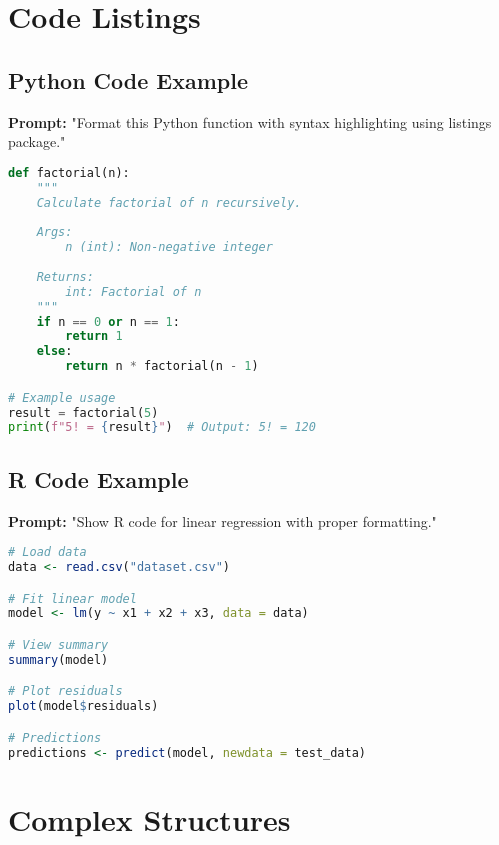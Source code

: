 \documentclass[12pt, a4paper]{article}
\begin{document}
\section{Code Listings}

\subsection{Python Code Example}

\textbf{Prompt:} "Format this Python function with syntax highlighting using listings package."

\begin{lstlisting}[language=Python, caption={Python function for calculating factorial}, label=lst:factorial]
def factorial(n):
    """
    Calculate factorial of n recursively.
    
    Args:
        n (int): Non-negative integer
    
    Returns:
        int: Factorial of n
    """
    if n == 0 or n == 1:
        return 1
    else:
        return n * factorial(n - 1)

# Example usage
result = factorial(5)
print(f"5! = {result}")  # Output: 5! = 120
\end{lstlisting}

\subsection{R Code Example}

\textbf{Prompt:} "Show R code for linear regression with proper formatting."

\begin{lstlisting}[language=R, caption={Linear regression in R}, label=lst:regression]
# Load data
data <- read.csv("dataset.csv")

# Fit linear model
model <- lm(y ~ x1 + x2 + x3, data = data)

# View summary
summary(model)

# Plot residuals
plot(model$residuals)

# Predictions
predictions <- predict(model, newdata = test_data)
\end{lstlisting}

\section{Complex Structures}
\end{document}
